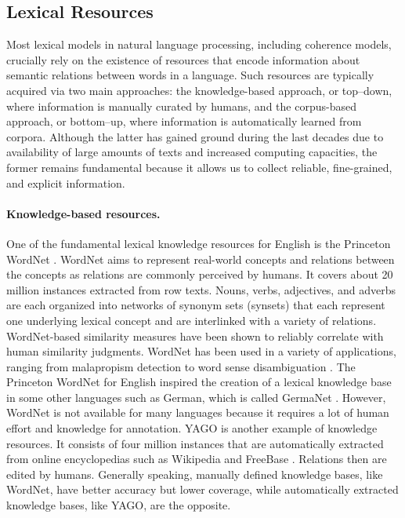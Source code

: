 \subsection{Lexical Resources} 

Most lexical models in natural language processing, including coherence models, crucially rely on the existence of resources that encode information about semantic relations between words in a language. 
Such resources are typically acquired via two main approaches: the knowledge-based approach, or top–down, where information is manually curated by humans, and the corpus-based approach, or bottom–up, where information is automatically learned from corpora. 
Although the latter has gained ground during the last decades due to availability of large amounts of texts and increased computing capacities, the former remains fundamental because it allows us to collect reliable, fine-grained, and explicit information. 

\paragraph{Knowledge-based resources.}
One of the fundamental lexical knowledge resources for English is the Princeton WordNet \cite{fellbaum98}.  
WordNet aims to represent real-world concepts and relations between the concepts as relations are commonly perceived by humans. 
It covers about 20 million instances extracted from row texts. 
Nouns, verbs, adjectives, and adverbs are each organized into networks of synonym sets (synsets) that each represent one underlying lexical concept and are interlinked with a variety of relations. 
WordNet-based similarity measures have been shown to reliably correlate with human similarity judgments. 
WordNet has been used in a variety of applications, ranging from malapropism detection to word sense disambiguation \cite{budanitsky06}.  
The Princeton WordNet for English inspired the creation of a lexical knowledge base in some other languages such as German, which is called GermaNet \cite{hamp97}. 
However, WordNet is not available for many languages because it requires a lot of human effort and knowledge for annotation.  
YAGO \cite{hoffart13} is another example of knowledge resources.  
It consists of four million instances that are automatically extracted from online encyclopedias such as Wikipedia \cite{denoyer06} and FreeBase \cite{bollacker08}. 
Relations then are edited by humans. 
Generally speaking, manually defined knowledge bases, like WordNet, have better accuracy but lower coverage, while automatically extracted knowledge bases, like YAGO, are the opposite. 

